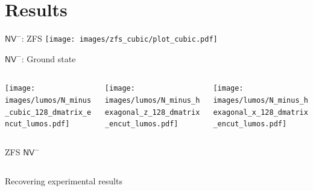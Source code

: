 \documentclass[handout]{beamer}
\begin{document}

\section{Results} %

\begin{frame}{$ \mathsf{NV}^{-} $: ZFS }
  \texttt{[image: images/zfs\_cubic/plot\_cubic.pdf]}
\end{frame}

\begin{frame}{ $ \mathsf{NV}^{-} $: Ground state}
  \begin{center}
    \begin{columns}
      \begin{column}{0.3\textwidth}
        \texttt{[image: images/lumos/N\_minus\_cubic\_128\_dmatrix\_encut\_lumos.pdf]}
      \end{column}
      \begin{column}{0.3\textwidth}
        \texttt{[image: images/lumos/N\_minus\_hexagonal\_z\_128\_dmatrix\_encut\_lumos.pdf]}
      \end{column}
      \begin{column}{0.3\textwidth}
        \texttt{[image: images/lumos/N\_minus\_hexagonal\_x\_128\_dmatrix\_encut\_lumos.pdf]}
      \end{column}
    \end{columns}
  \end{center}
\end{frame}



\begin{frame}{ZFS $ \mathsf{NV}^{-} $ }
  \begin{columns}
    \begin{column}{0.5\textwidth}
      Recovering experimental results
    \end{column}
    \begin{column}{0.5\textwidth}

    \end{column}
  \end{columns}
\end{frame}
\end{document}
